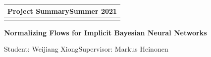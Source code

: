 \documentclass[a4paper,11pt]{article} %
\newcommand{\lineSpace}{1.1}
\newcommand{\exeNum}{}
\newcommand{\assType}{Normalizing Flows for Implicit Bayesian Neural Networks}
\newcommand{\courseName}{Project Summary}
\newcommand{\semester}{Summer 2021}
\newcommand{\studentName}{Weijiang Xiong}
\newcommand{\studentNumber}{875581}
\begin{document}
\linespread{\lineSpace} %




\thispagestyle{empty} %

\begin{tabular}{p{16.5cm}} %
{\large \bf \courseName \hfill \semester} \\
\hline %
\\
\end{tabular} %


\begin{center} %
	{\Large \bf \assType\ \exeNum} %

	\vspace{1em}

	{Student: \studentName \qquad Supervisor: Markus Heinonen}
\end{center}  
% 

\end{document}
